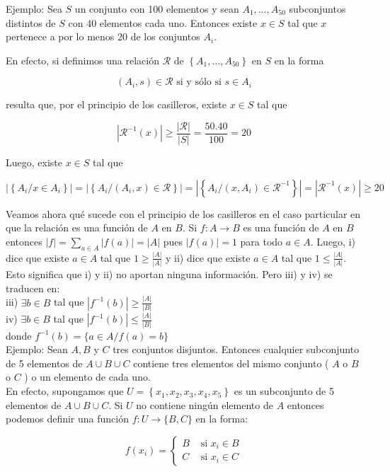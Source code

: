 \documentclass[10pt]{article}
\begin{document}
Ejemplo: Sea $S$ un conjunto con 100 elementos y sean $A_{1}, \ldots, A_{50}$ subconjuntos distintos de $S$ con 40 elementos cada uno. Entonces existe $x \in S$ tal que $x$ pertenece a por lo menos 20 de los conjuntos $A_{i}$.

En efecto, si definimos una relación $\mathcal{R}$ de $\left\{A_{1}, \ldots, A_{50}\right\}$ en $S$ en la forma

$$
\left(A_{i}, s\right) \in \mathcal{R} \text { si y sólo si } s \in A_{i}
$$

resulta que, por el principio de los casilleros, existe $x \in S$ tal que

$$
\left|\mathcal{R}^{-1}(x)\right| \geq \frac{|\mathcal{R}|}{|S|}=\frac{50.40}{100}=20
$$

Luego, existe $x \in S$ tal que

$$
\left|\left\{A_{i} / x \in A_{i}\right\}\right|=\left|\left\{A_{i} /\left(A_{i}, x\right) \in \mathcal{R}\right\}\right|=\left|\left\{A_{i} /\left(x, A_{i}\right) \in \mathcal{R}^{-1}\right\}\right|=\left|\mathcal{R}^{-1}(x)\right| \geq 20
$$

Veamos ahora qué sucede con el principio de los casilleros en el caso particular en que la relación es una función de $A$ en $B$. Si $f: A \longrightarrow B$ es una función de $A$ en $B$ entonces $|f|=\sum_{a \in A}|f(a)|=|A|$ pues $|f(a)|=1$ para todo $a \in A$. Luego, i) dice que existe $a \in A$ tal que $1 \geq \frac{|A|}{|A|}$ y ii) dice que existe $a \in A$ tal que $1 \leq \frac{|A|}{|A|}$. Esto significa que i) y ii) no aportan ninguna información. Pero iii) y iv) se traducen en:\\
iii) $\exists b \in B$ tal que $\left|f^{-1}(b)\right| \geq \frac{|A|}{|B|}$\\
iv) $\exists b \in B$ tal que $\left|f^{-1}(b)\right| \leq \frac{|A|}{|B|}$\\
donde $f^{-1}(b)=\{a \in A / f(a)=b\}$\\
Ejemplo: Sean $A, B$ y $C$ tres conjuntos disjuntos. Entonces cualquier subconjunto de 5 elementos de $A \cup B \cup C$ contiene tres elementos del mismo conjunto ( $A$ o $B$ o $C$ ) o un elemento de cada uno.\\
En efecto, supongamos que $U=\left\{x_{1}, x_{2}, x_{3}, x_{4}, x_{5}\right\}$ es un subconjunto de 5 elementos de $A \cup B \cup C$. Si $U$ no contiene ningún elemento de $A$ entonces podemos definir una función $f: U \longrightarrow\{B, C\}$ en la forma:

$$
f\left(x_{i}\right)= \begin{cases}B & \text { si } x_{i} \in B \\ C & \text { si } x_{i} \in C\end{cases}
$$
\end{document}
